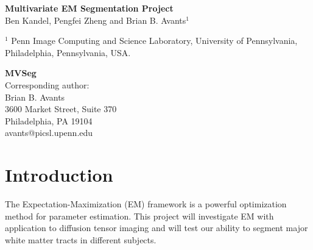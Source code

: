 \documentclass[11pt,english]{article}
\begin{document}
\normalem

\vspace*{5cm}

\begin{center}
{\Large \bf Multivariate EM Segmentation Project} \\
\vspace*{0.5cm}
{\normalsize Ben Kandel, Pengfei Zheng and Brian B. Avants$^1$} \\
\begin{singlespace} 
{\scriptsize  $^1$ Penn Image Computing and Science Laboratory, University of Pennsylvania, Philadelphia, Pennsylvania,  USA.}
\end{singlespace}
\end{center}

\vfill

\begin{singlespace} 
\scriptsize
\flushleft
{\bf MVSeg}\\
Corresponding author: \\
Brian B. Avants\\
3600 Market Street, Suite 370\\
Philadelphia, PA  19104\\
avants@picsl.upenn.edu\\
\end{singlespace} 
\clearpage
\begin{abstract} 
Neuroanatomical coordinate systems are essential for the
interpretation of structural and functional imaging studies.  However,
manual delineation of the neuroanatomical complex is time consuming
and prone to random performance variability.  This work describes an
open source, image-based approach to white matter parcellation which
uses training data to propagate structural labelings to individual
images.  The Bayesian formulation of the segmentation problem is
solved using the Expectation Maximization (EM) algorithm with a
variety of different multivariate distance metrics.  We evaluate our
ability to segment DTI data based on comparison with
registration-based approaches and biological validity of results.
\end{abstract}

\section{Introduction}
The Expectation-Maximization (EM) framework \citep{Dempster1977} is a
powerful optimization method for parameter estimation.  This project
will investigate EM with application to diffusion tensor imaging and
will test our ability to segment major white matter tracts in
different subjects.    
\end{document}
